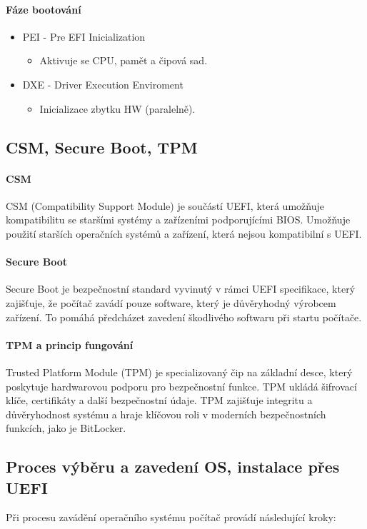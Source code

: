 \paragraph{Fáze bootování}
\begin{itemize}
    \item PEI - Pre EFI Inicialization
    \begin{itemize}
        \item Aktivuje se CPU, pamět a čipová sad.
    \end{itemize}
    \item DXE - Driver Execution Enviroment
    \begin{itemize}
        \item Inicializace zbytku HW (paralelně).
    \end{itemize}
\end{itemize}

\subsection{CSM, Secure Boot, TPM}
\paragraph{CSM}
CSM (Compatibility Support Module) je součástí UEFI, která umožňuje kompatibilitu se staršími systémy a zařízeními podporujícími BIOS. Umožňuje použití starších operačních systémů a zařízení, která nejsou kompatibilní s UEFI.

\paragraph{Secure Boot}
Secure Boot je bezpečnostní standard vyvinutý v rámci UEFI specifikace, který zajišťuje, že počítač zavádí pouze software, který je důvěryhodný výrobcem zařízení. To pomáhá předcházet zavedení škodlivého softwaru při startu počítače.

\paragraph{TPM a princip fungování}
Trusted Platform Module (TPM) je specializovaný čip na základní desce, který poskytuje hardwarovou podporu pro bezpečnostní funkce. TPM ukládá šifrovací klíče, certifikáty a další bezpečnostní údaje. TPM zajišťuje integritu a důvěryhodnost systému a hraje klíčovou roli v moderních bezpečnostních funkcích, jako je BitLocker.

\subsection{Proces výběru a zavedení OS, instalace přes UEFI}
Při procesu zavádění operačního systému počítač provádí následující kroky:

